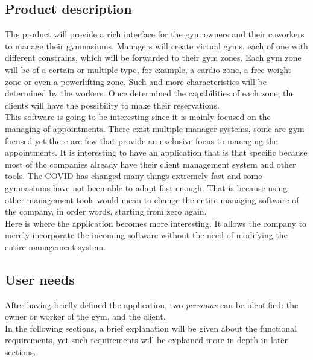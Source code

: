 \documentclass[a4paper, 12pt, oneside]{book}
\begin{document}
\subsection{Product description}
The product will provide a rich interface for the gym owners and their coworkers to manage their gymnasiums. Managers will create virtual gyms, each of one with different constrains, which will be forwarded to their gym zones. Each gym zone will be of a certain or multiple type, for example, a cardio zone, a free-weight zone or even a powerlifting zone. Such and more characteristics will be determined by the workers. Once determined the capabilities of each zone, the clients will have the possibility to make their reservations.
\\[8pt]
This software is going to be interesting since it is mainly focused on the managing of appointments. There exist multiple manager systems, some are gym-focused yet there are few that provide an exclusive focus to managing the appointments. It is interesting to have an application that is that specific because most of the companies already have their client management system and other tools. The COVID has changed many things extremely fast and some gymnasiums have not been able to adapt fast enough. That is because using other management tools would mean to change the entire managing software of the company, in order words, starting from zero again.
\\[8pt]
Here is where the application becomes more interesting. It allows the company to merely incorporate the incoming software without the need of modifying the entire management system.
\subsection{User needs}
After having briefly defined the application, two \emph{personas} can be identified: the owner or worker of the gym, and the client.
\\[8pt]
In the following sections, a brief explanation will be given about the functional requirements, yet such requirements will be explained more in depth in later sections.
\end{document}
